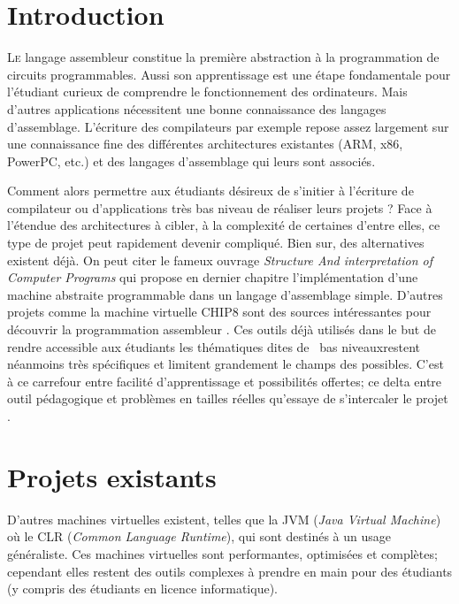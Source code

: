 \documentclass[11pt,twoside]{article}
\begin{document}
\hspace{0pt}
\vfill

\section{Introduction}

\lettrine[lines=3,slope=.3em]%
{L}{e} langage assembleur constitue la première abstraction à la programmation
de circuits programmables. Aussi son apprentissage est une étape fondamentale pour l'étudiant curieux de comprendre le fonctionnement des ordinateurs. Mais d'autres applications nécessitent une bonne connaissance des langages d'assemblage. L'écriture des compilateurs par exemple repose assez largement sur une connaissance fine des différentes architectures existantes (ARM, x86, PowerPC, etc.) et des langages d'assemblage qui leurs sont associés.

Comment alors permettre aux étudiants désireux de s'initier à l'écriture de compilateur ou d'applications très bas niveau de réaliser leurs projets ? Face à l'étendue des architectures à cibler, à la complexité de certaines d’entre elles, ce type de projet peut rapidement devenir compliqué. Bien sur, des alternatives existent déjà. On peut citer le fameux ouvrage \textit{Structure And interpretation of Computer Programs} \cite{SICP} qui propose en dernier chapitre l'implémentation d'une machine abstraite programmable dans un langage d'assemblage simple. D'autres projets comme la machine virtuelle CHIP8 sont des sources intéressantes pour découvrir la programmation assembleur \cite{CHIP8}. Ces outils déjà utilisés dans le but de rendre accessible aux étudiants les thématiques dites de \og~bas niveaux\fg restent néanmoins très spécifiques et limitent grandement le champs des possibles. C'est à ce carrefour entre facilité d'apprentissage et possibilités offertes; ce delta entre outil pédagogique et problèmes en tailles réelles qu'essaye de s'intercaler le projet . \\

\section{Projets existants}

D'autres machines virtuelles existent, telles que la JVM (\emph{Java Virtual Machine}) où le CLR (\emph{Common Language Runtime}), qui sont destinés à un usage généraliste. Ces machines virtuelles sont performantes, optimisées et complètes; cependant elles restent des outils complexes à prendre en main pour des étudiants (y compris des étudiants en licence informatique).\\
\end{document}
